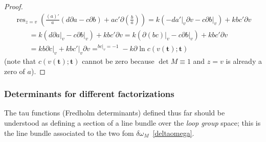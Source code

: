\documentclass[pdftex]{sigma}
\numberwithin{equation}{section}
\def \res#1{\mathop {\mathrm{res}}_{#1}}
\def \pa{\partial}
\def \t{\mathbf t}
\begin{document}
\begin{proof}
\begin{gather*}
\res{z=v}\left( \frac {(a)'}{a}\left( d \pa a - c \pa b \right)+ {ac'} \pa \left(\frac b a \right) \right)= k \left( {-}d a'\big|_v \pa v - c \pa b\big|_v\right) + k bc' \pa v\\
\qquad{} = k \left( d \pa a \big|_v - c \pa b\big|_v\right) + k bc' \pa v = k \left( \pa (bc) \big|_v - c \pa b\big|_v\right) + k bc' \pa v\\
\qquad{} = k b \pa c \big|_v + k bc'\big |_v \pa v \mathop{=}^{bc|_v =-1} - k \pa \ln c(v(\t);\t)
\end{gather*}
(note that $c(v(\t);\t)$ cannot be zero because $\det M\equiv 1$ and $z=v$ is already a zero of $a$).
\end{proof}

\subsubsection{Determinants for dif\/ferent factorizations}

The tau functions (Fredholm determinants) def\/ined thus far should be understood as def\/ining a section of a line bundle over the {\em loop group} space; this is the line bundle associated to the two fom $\delta \omega_M$~\eqref{deltaomega}.
\end{document}
